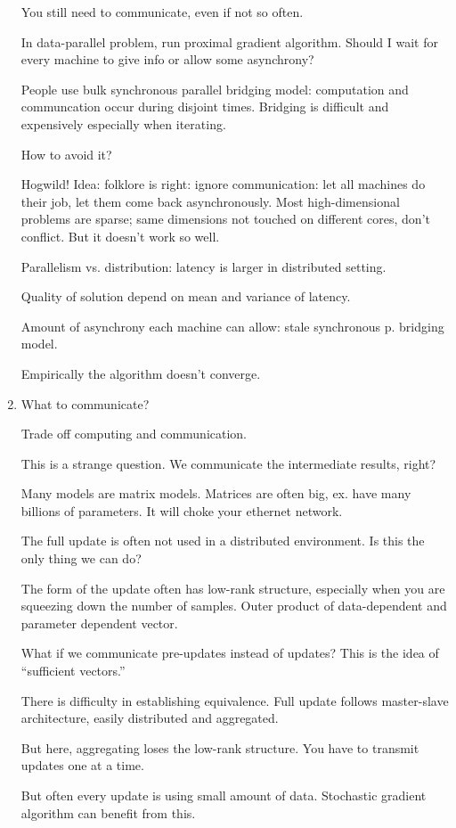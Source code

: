 \begin{enumerate}
You still need to communicate, even if not so often. 

In data-parallel problem, run proximal gradient algorithm. %
Should I wait for every machine to give info or allow some asynchrony?

People use bulk synchronous parallel bridging model: computation and communcation occur during disjoint times.
Bridging is difficult and expensively especially when iterating. 

How to avoid it?

Hogwild! Idea: folklore is right: ignore communication: let all machines do their job, let them come back asynchronously. Most high-dimensional problems are sparse; same dimensions not touched on different cores, don't conflict. But it doesn't work so well.

Parallelism vs. distribution: latency is larger in distributed setting.

Quality of solution depend on mean and variance of latency.

Amount of asynchrony each machine can allow: stale synchronous p. %
bridging model. 

Empirically the algorithm doesn't converge. 
\item
What to communicate?

Trade off computing and communication.

This is a strange question. We communicate the intermediate results, right? 

Many models are matrix models. %
Matrices are often big, ex. have many billions of parameters. It will choke your ethernet network.

The full update is often not used in a distributed environment. Is this the only thing we can do?

The form of the update often has low-rank structure, especially when you are squeezing down the number of samples. Outer product of data-dependent and parameter dependent vector. 

What if we communicate pre-updates instead of updates? This is the idea of ``sufficient vectors.''

There is difficulty in establishing equivalence. Full update follows master-slave architecture, easily distributed and aggregated.

But here, aggregating loses the low-rank structure. You have to transmit updates one at a time.

But often every update is using small amount of data.
Stochastic gradient algorithm can benefit from this.


\end{enumerate}
